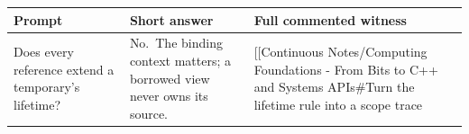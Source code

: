 {\def\LTcaptype{none} %
\begin{longtable}[]{@{}
  >{\raggedright\arraybackslash}p{}
  >{\raggedright\arraybackslash}p{}
  >{\raggedright\arraybackslash}p{}@{}}
\toprule\noalign{}
\begin{minipage}[b]{\linewidth}\raggedright
Prompt
\end{minipage} & \begin{minipage}[b]{\linewidth}\raggedright
Short answer
\end{minipage} & \begin{minipage}[b]{\linewidth}\raggedright
Full commented witness
\end{minipage} \\
\midrule\noalign{}
\endhead
\bottomrule\noalign{}
\endlastfoot
Does every reference extend a temporary's lifetime? & No.~The binding context matters; a borrowed view never owns its source. & {[}{[}Continuous Notes/Computing Foundations - From Bits to C++ and Systems APIs\#Turn the lifetime rule into a scope trace \\
\end{longtable}
}
